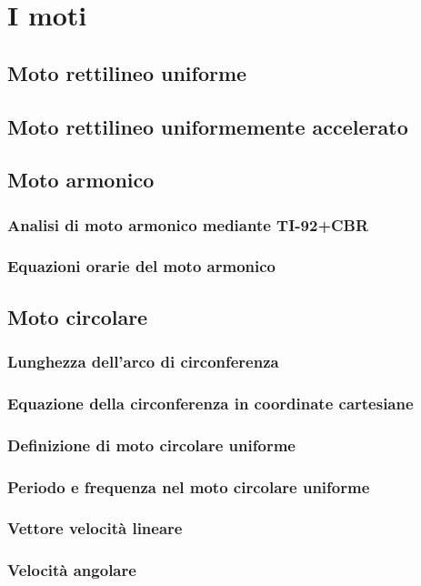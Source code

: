 \section{I moti}
\subsection{Moto rettilineo uniforme}
\subsection{Moto rettilineo uniformemente accelerato}
\subsection{Moto armonico}
\subsubsection{Analisi di moto armonico mediante TI-92+CBR}
\subsubsection{Equazioni orarie del moto armonico}
\subsection{Moto circolare}
\subsubsection{Lunghezza dell'arco di circonferenza}
\subsubsection{Equazione della circonferenza in coordinate cartesiane}
\subsubsection{Definizione di moto circolare uniforme}
\subsubsection{Periodo e frequenza nel moto circolare uniforme}
\subsubsection{Vettore velocità lineare}
\subsubsection{Velocità angolare}
